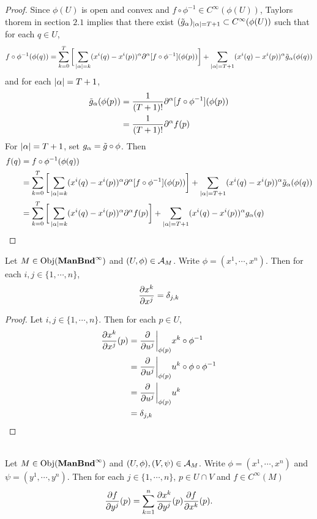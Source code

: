 \documentclass{book}
\begin{document}
\begin{proof}
	Since $\phi(U)$ is open and convex and $f \circ \phi^{-1} \in C^{\infty}(\phi(U))$, Taylors thorem in section $2.1$ implies that there exist $(\tilde{g}_{\alpha})_{|\alpha| = T+1} \subset C^{\infty}(\phi(U))$ such that for each $q \in U$, 
	$$f \circ \phi^{-1} (\phi(q)) = \sum_{k=0}^{T} \bigg[\sum_{|\alpha| = k}(x^i(q) - x^i(p))^{\alpha} \partial^{\alpha} [f \circ \phi^{-1}] (\phi(p)) \bigg] + \sum_{|\alpha| = T+1}(x^i(q) - x^i(p))^{\alpha} \tilde{g}_{\alpha}(\phi(q)) $$	
	and for each $|\alpha|= T+1$, 
	\begin{align*}
		\tilde{g}_{\alpha}(\phi(p)) 
		&= \frac{1}{(T+1)!}\partial^{\alpha} [f \circ \phi^{-1}](\phi(p)) \\
		&= \frac{1}{(T+1)!}\partial^{\alpha} f (p)
	\end{align*}
	For $|\alpha| = T+1$, set $g_{\alpha} = \tilde{g} \circ \phi$. Then 
	\begin{align*}
		f(q) 
		&= f \circ \phi^{-1} (\phi(q)) \\
		&= \sum_{k=0}^{T} \bigg[\sum_{|\alpha| = k}(x^i(q) - x^i(p))^{\alpha} \partial^{\alpha} [f \circ \phi^{-1}] (\phi(p)) \bigg] + \sum_{|\alpha| = T+1}(x^i(q) - x^i(p))^{\alpha} \tilde{g}_{\alpha}(\phi(q)) \\
		&= \sum_{k=0}^{T} \bigg[\sum_{|\alpha| = k}(x^i(q) - x^i(p))^{\alpha} \partial^{\alpha} f(p) \bigg] + \sum_{|\alpha| = T+1}(x^i(q) - x^i(p))^{\alpha} g_{\alpha}(q) \\
	\end{align*}			
\end{proof}


\begin{ex}
	Let $M \in \operatorname{Obj}(\operatorname*{\text{\textbf{ManBnd}}^{\infty}})$ and $(U, \phi) \in \mathcal{A}_M$. Write $\phi = (x^1, \cdots, x^n)$. Then for each $i,j \in \{1, \cdots, n\}$,  
	$$\frac{\partial x^k}{\partial x^j} = \delta_{j,k}$$
\end{ex}

\begin{proof}
	Let $i,j \in \{1, \cdots, n\}$. Then for each $p \in U$,
	\begin{align*}
		\frac{\partial x^k}{\partial x^j} (p) 
		&=  \frac{\partial}{\partial u^j} \bigg|_{\phi(p)} x^k \circ \phi^{-1} \\
		&= \frac{\partial}{\partial u^j} \bigg|_{\phi(p)} u^k \circ \phi \circ \phi^{-1} \\
		&= \frac{\partial}{\partial u^j} \bigg|_{\phi(p)} u^k  \\
		&= \delta_{j, k}
	\end{align*}
\end{proof}

\begin{ex} \\
	Let $M \in \operatorname{Obj}(\operatorname*{\text{\textbf{ManBnd}}^{\infty}})$ and $(U, \phi), (V, \psi) \in \mathcal{A}_M$. Write $\phi = (x^1, \cdots, x^n)$ and $\psi = (y^1, \cdots, y^n)$. Then for each $j \in \{1, \cdots, n\}$, $p \in U \cap V$ and $f \in C^{\infty}(M)$ 
	$$\frac{\partial f}{\partial y^j}(p) = \sum_{k =1}^n \frac{\partial x^k}{\partial y^j}(p)  \frac{\partial f}{\partial x^k}(p).$$
\end{ex}
\end{document}
